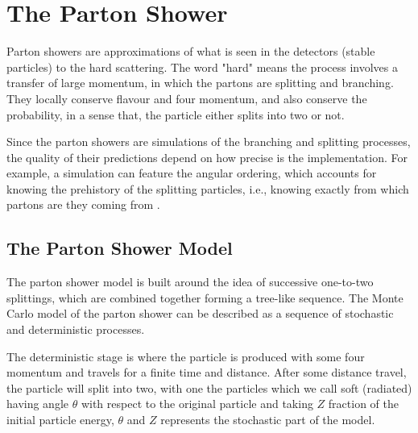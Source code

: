 \chapter{The Parton Shower}

Parton showers are approximations of what is seen in the detectors (stable particles) to the hard scattering. The word "hard" means the process involves a transfer of large momentum, in which the partons are splitting and branching.  
They locally conserve flavour and four momentum, and also conserve the probability, in a sense that, the particle either splits into two or not.
 
Since the parton showers are simulations of the branching and splitting processes, the quality of their predictions depend on how precise is the implementation. For example, a simulation can feature the angular ordering, which accounts for knowing the prehistory of the splitting particles, i.e.,
knowing exactly from which partons are they coming from \citep{introduction}.

\section{The Parton Shower Model}\label{qcda}
The parton shower model is built around the idea of successive one-to-two splittings, which are combined together forming a tree-like sequence. The Monte Carlo model of the parton shower can be described as a sequence of stochastic and deterministic processes. 



The deterministic stage is where the particle is produced with some four momentum and travels for a finite time and distance.
After some distance travel, the particle will split into two,
with one the particles  which we call soft (radiated) having angle $\theta$ with respect to the original particle and taking $Z$ fraction of the initial particle energy, $\theta$ and $Z$ represents the stochastic part of the model.
 
